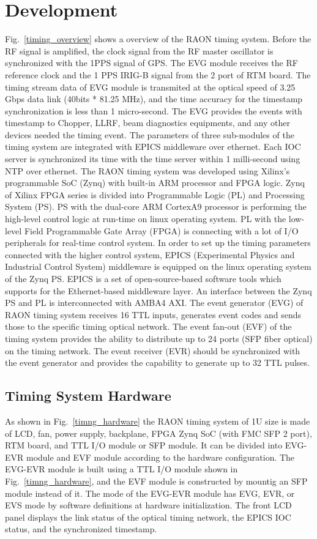 \documentclass[journal,reqno]{IEEEtran}
\begin{document}
\section{Development}
Fig.~\ref{timing_overview} shows a overview of the RAON timing system. Before the RF signal is amplified, the clock signal from the RF master oscillator is synchronized with the 1PPS signal of GPS\cite{frib_timing,taiwan_timing}. The EVG module receives the RF reference clock and the 1 PPS IRIG-B signal from the 2 port of RTM board. The timing stream data of EVG module is transmited at the optical speed of 3.25 Gbps data link (40bits * 81.25 MHz), and the time accuracy for the timestamp synchronization is less than 1 micro-second. The EVG provides the events with timestamp to Chopper, LLRF, beam diagnostics equipments, and any other devices needed the timing event\cite{frib_timing,taiwan_timing}. The parameters of three sub-modules of the timing system are integrated with EPICS middleware over ethernet. Each IOC server is synchronized its time with the time server within 1 milli-second using NTP over ethernet. The RAON timing system was developed using Xilinx’s programmable SoC (Zynq) with built-in ARM processor and FPGA logic. Zynq of Xilinx FPGA series is divided into Programmable Logic (PL) and Processing System (PS). PS with the dual-core ARM CortexA9 processor is performing the high-level control logic at run-time on linux operating system. PL with the low-level Field Programmable Gate Array (FPGA) is connecting with a lot of I/O peripherals for real-time control system\cite{parallel}. In order to set up the timing parameters connected with the higher control system, EPICS (Experimental Physics and Industrial Control System) middleware is equipped on the linux operating system of the Zynq PS. EPICS is a set of open-source-based software tools which supports for the Ethernet-based middleware layer. An interface between the Zynq PS and PL is interconnected with AMBA4 AXI. The event generator (EVG) of RAON timing system receives 16 TTL inputs, generates event codes and sends those to the specific timing optical network. The event fan-out (EVF) of the timing system provides the ability to distribute up to 24 ports (SFP fiber optical) on the timing network. The event receiver (EVR) should be synchronized with the event generator and provides the capability to generate up to 32 TTL pulses. 
\subsection{Timing System Hardware}
As shown in Fig.~\ref{timng_hardware} the RAON timing system of 1U size is made of LCD, fan, power supply, backplane, FPGA Zynq SoC (with FMC SFP 2 port), RTM board, and TTL I/O module or SFP module. It can be divided into EVG-EVR module and EVF module according to the hardware configuration. The EVG-EVR module is built using a TTL I/O module shown in Fig.~\ref{timng_hardware}, and the EVF module is constructed by mountig an SFP module instead of it. The mode of the EVG-EVR module has EVG, EVR, or EVS mode by software definitions at hardware initialization. The front LCD panel displays the link status of the optical timing network, the EPICS IOC status, and the synchronized timestamp.
\end{document}
